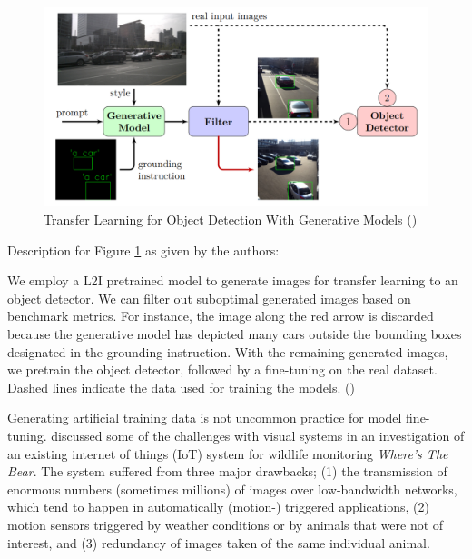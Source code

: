 \begin{figure}[H]
    \centering
    \includegraphics[width=\textwidth]{Images/Diagrams/generated_training_images.png}
    \caption{Transfer Learning for Object Detection With Generative Models (\cite{TransferLearningGenerative2023})}
    \label{fig:training_data_generated}
\end{figure}

Description for Figure \ref{fig:training_data_generated} as given by the authors:

\begin{myquote}
    We employ a L2I pretrained model to generate images for transfer learning to an object detector. We can filter out suboptimal generated images based on benchmark metrics. For instance, the image along the red arrow is discarded because the generative model has depicted many cars outside the bounding boxes designated in the grounding instruction. With the remaining generated images, we pretrain the object detector, followed by a fine-tuning on the real dataset. Dashed lines indicate the data used for training the models. (\cite{TransferLearningGenerative2023})
\end{myquote}

Generating artificial training data is not uncommon practice for model fine-tuning. \citeauthor{el2017WTB} discussed some of the challenges with visual systems in an investigation of an existing internet of things (IoT) system for wildlife monitoring \textit{Where's The Bear}. The system suffered from three major drawbacks; (1) the transmission of enormous numbers (sometimes millions) of images over low-bandwidth networks, which tend to happen in automatically (motion-) triggered applications, (2) motion sensors triggered by weather conditions or by animals that were not of interest, and (3) redundancy of images taken of the same individual animal.

